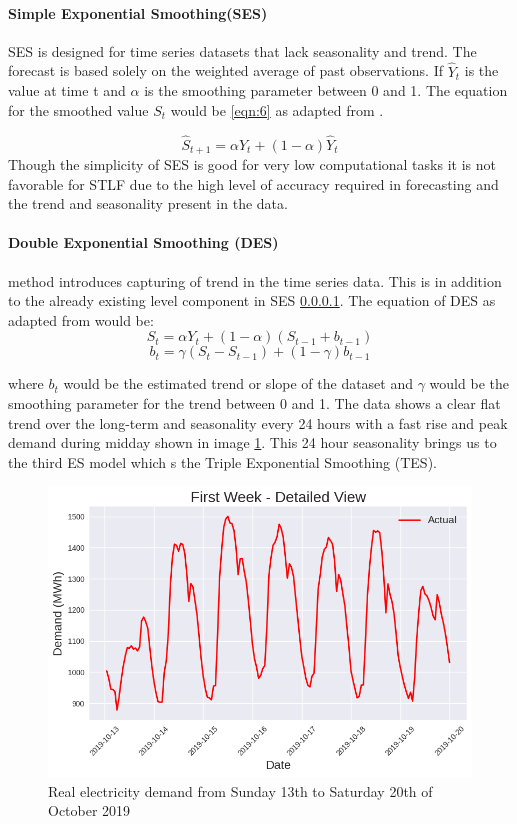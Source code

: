 \paragraph{Simple Exponential Smoothing(SES)}\label{par:ses}
SES is designed for time series datasets that lack seasonality and trend. The forecast is based solely on the weighted average of past observations. If $\hat{Y}_{t}$  is the value at time t  and $\alpha$ is the smoothing parameter between 0 and 1. The equation for the smoothed value $S_{t}$ would be \ref{eqn:6} as adapted from \cite{ostertagova2011simple}.

\[
\hat{S}_{t+1}  = \alpha Y_t + (1-\alpha)\hat{Y}_t
\tag{6}
\label{eqn:6}
\]
 Though the simplicity of SES is good for very low computational tasks it is not favorable for STLF due to the high level of accuracy required in forecasting and the trend and seasonality present in the data.
 
 \paragraph{Double Exponential Smoothing (DES)} method introduces capturing of trend in the time series data. This is in addition to the already existing level component in SES \ref{par:ses}. The equation of DES as adapted from \cite{nist_double_exp_smoothing} would be:
 \[
  S_t = \alpha Y_t + (1-\alpha)(S_{t-1} + b_{t-1})
  \tag{7}
 \label{eqn:7}
 \] 
 \[
  b_t = \gamma (S_t - S_{t-1}) + (1-\gamma) b_{t-1}
  \tag{8}
 \label{eqn:8}
 \]
 
 where $b_t$ would be the estimated trend or slope of the dataset and $\gamma$ would be the smoothing parameter for the trend  between 0 and 1. The data shows a clear flat trend over the long-term and seasonality every 24 hours with a fast rise and peak demand during midday shown in image \ref{fig:weeklydemand}. This 24 hour seasonality brings us to the third ES model which s the Triple Exponential Smoothing (TES). 
 \begin{figure}[h]
 	\centering
 	\includegraphics[width=0.7\linewidth]{Chapters/images/weekly_demand}
 	\caption{Real electricity demand from Sunday 13th to Saturday 20th of October 2019}
 	\label{fig:weeklydemand}
 \end{figure}
 
